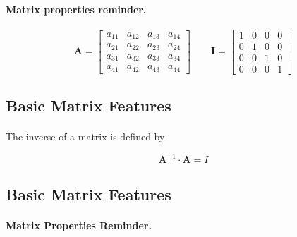 \documentclass[%
oneside,                 %
final,                   %
10pt]{article}
\begin{document}
\paragraph{Matrix properties reminder.}
\[
 \mathbf{A} =
      \begin{bmatrix} a_{11} & a_{12} & a_{13} & a_{14} \\
                                 a_{21} & a_{22} & a_{23} & a_{24} \\
                                   a_{31} & a_{32} & a_{33} & a_{34} \\
                                  a_{41} & a_{42} & a_{43} & a_{44}
             \end{bmatrix}\qquad
\mathbf{I} =
      \begin{bmatrix} 1 & 0 & 0 & 0 \\
                                 0 & 1 & 0 & 0 \\
                                 0 & 0 & 1 & 0 \\
                                 0 & 0 & 0 & 1
             \end{bmatrix}
\]



\subsection*{Basic Matrix Features}

\paragraph{}

The inverse of a matrix is defined by

\[
\mathbf{A}^{-1} \cdot \mathbf{A} = I
\]




\subsection*{Basic Matrix Features}


\paragraph{Matrix Properties Reminder.}
\end{document}
